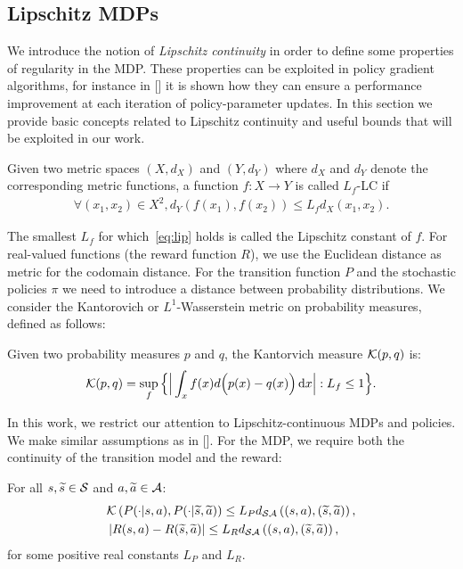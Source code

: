 \subsection{Lipschitz \ac{MDPs}}
We introduce the notion of \emph{Lipschitz continuity} in order to define some properties of regularity in the \ac{MDP}. These properties can be exploited in policy gradient algorithms, for instance in [\cite{pirotta2015policy}] it is shown how they can ensure a performance improvement at each iteration of policy-parameter updates. In this section we provide basic concepts related to Lipschitz continuity and useful bounds that will be exploited in our work.
\begin{definition}
Given two metric spaces $(X, d_X)$ and $(Y, d_Y)$ where $d_X$ and $d_Y$ denote the corresponding metric functions, a function $f: X \rightarrow Y$ is called $L_f$-\acf{LC} if
\begin{align} \forall(x_1, x_2) \in X^2, d_Y(f(x_1), f(x_2)) \leq L_f d_X(x_1, x_2). \label{eq:lip} \end{align}
\end{definition}
\noindent The smallest $L_f$ for which~\eqref{eq:lip} holds is called the Lipschitz constant of $f$. For real-valued functions (\eg the reward function $R$), we use the Euclidean distance as metric for the codomain distance. For the transition function $P$ and the stochastic policies $\pi$ we need to introduce a distance between probability distributions. We consider the Kantorovich or $L^1$-Wasserstein metric on probability measures, defined as follows:
\begin{definition}
Given two probability measures $p$ and $q$, the Kantorvich measure $\mathcal{K}(p, q)$ is:
\begin{align} \mathcal{K}(p, q) = \sup_f\Big\{ \Big| \int_x f(x) d\Big(p(x)-q(x)\Big) \,\mathrm{d} x \Big|: L_f \leq 1 \Big\}. \label{eq:kant}\end{align}
\end{definition}
\noindent In this work, we restrict our attention to Lipschitz-continuous MDPs and policies. We make similar assumptions as in [\cite{pirotta2015policy}]. For the MDP, we require both the continuity of the transition model and the reward:
%
\begin{assumption}\label{ass:lipmdp}
	For all $s,\widetilde{s}\in\mathcal{S}$ and $a,\widetilde{a}\in\mathcal{A}$:
	\begin{align}
	&\mathcal{K}\left(P(\cdot|s,a), P(\cdot| \widetilde{s},\widetilde{a})\right) \leq L_{P}d_{\mathcal{S}\mathcal{A}}\left((s,a),(\widetilde{s},\widetilde{a})\right), \\
	&\left|R(s,a) - R(\widetilde{s},\widetilde{a})\right| \leq L_{R}d_{\mathcal{S}\mathcal{A}}\left((s,a),(\widetilde{s},\widetilde{a})\right),
	\end{align}
	for some positive real constants $L_{P}$ and $L_{R}$.
\end{assumption}
